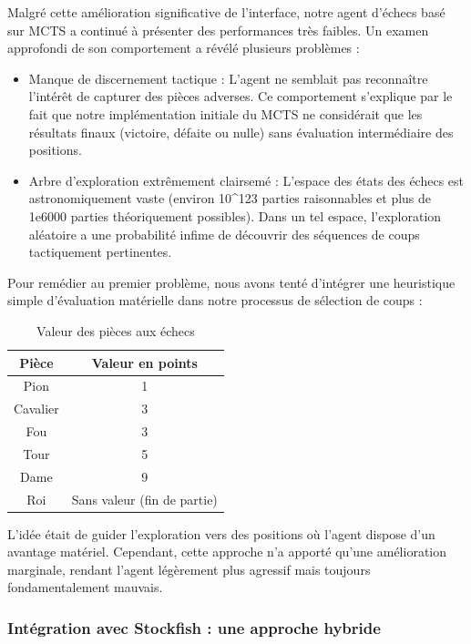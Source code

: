 \documentclass{article}
\begin{document}
Malgré cette amélioration significative de l'interface, notre agent d'échecs basé sur MCTS a continué à présenter des performances très faibles. Un examen approfondi de son comportement a révélé plusieurs problèmes :
\begin{itemize} 
    \item Manque de discernement tactique : L'agent ne semblait pas reconnaître l'intérêt de capturer des pièces adverses. Ce comportement s'explique par le fait que notre implémentation initiale du MCTS ne considérait que les résultats finaux (victoire, défaite ou nulle) sans évaluation intermédiaire des positions.
    \item Arbre d'exploration extrêmement clairsemé : L'espace des états des échecs est astronomiquement vaste (environ 10\^{}123 parties raisonnables et plus de 1e6000 parties théoriquement possibles). Dans un tel espace, l'exploration aléatoire a une probabilité infime de découvrir des séquences de coups tactiquement pertinentes.
\end{itemize}

Pour remédier au premier problème, nous avons tenté d'intégrer une heuristique simple d'évaluation matérielle dans notre processus de sélection de coups :
\begin{table}[h]
    \centering
    \begin{tabular}{|c|c|}
        \hline
        \textbf{Pièce} & \textbf{Valeur en points} \\
        \hline
        Pion & 1 \\
        Cavalier & 3 \\
        Fou & 3 \\
        Tour & 5 \\
        Dame & 9 \\
        Roi & Sans valeur (fin de partie) \\
        \hline
    \end{tabular}
    \caption{Valeur des pièces aux échecs}
    \label{tab:valeur_pieces}
\end{table}

L'idée était de guider l'exploration vers des positions où l'agent dispose d'un avantage matériel. Cependant, cette approche n'a apporté qu'une amélioration marginale, rendant l'agent légèrement plus agressif mais toujours fondamentalement mauvais.\\

    \subsubsection{Intégration avec Stockfish : une approche hybride}
\end{document}
